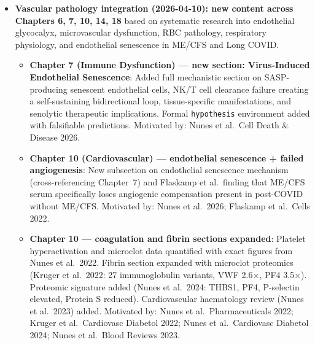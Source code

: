 \begin{itemize}

  \item \textbf{Vascular pathology integration (2026-04-10): new content across Chapters 6, 7, 10, 14, 18}
    based on systematic research into endothelial glycocalyx, microvascular dysfunction, RBC pathology,
    respiratory physiology, and endothelial senescence in ME/CFS and Long COVID.
    \begin{itemize}

      \item \textbf{Chapter 7 (Immune Dysfunction) --- new section: Virus-Induced Endothelial Senescence}:
        Added full mechanistic section on SASP-producing senescent endothelial cells, NK/T cell clearance
        failure creating a self-sustaining bidirectional loop, tissue-specific manifestations, and senolytic
        therapeutic implications. Formal \texttt{hypothesis} environment added with falsifiable predictions.
        Motivated by: Nunes et al.\ Cell Death \& Disease 2026.
        \cite{Nunes2026endothelialSenescence}

      \item \textbf{Chapter 10 (Cardiovascular) --- endothelial senescence + failed angiogenesis}:
        New subsection on endothelial senescence mechanism (cross-referencing Chapter~7) and Flaskamp et al.\
        finding that ME/CFS serum specifically loses angiogenic compensation present in post-COVID without ME/CFS.
        Motivated by: Nunes et al.\ 2026; Flaskamp et al.\ Cells 2022.
        \cite{Nunes2026endothelialSenescence, Flaskamp2022endothelial}

      \item \textbf{Chapter 10 --- coagulation and fibrin sections expanded}:
        Platelet hyperactivation and microclot data quantified with exact figures from Nunes et al.\ 2022.
        Fibrin section expanded with microclot proteomics (Kruger et al.\ 2022: 27 immunoglobulin variants,
        VWF 2.6$\times$, PF4 3.5$\times$). Proteomic signature added (Nunes et al.\ 2024: THBS1, PF4, P-selectin elevated,
        Protein S reduced). Cardiovascular haematology review (Nunes et al.\ 2023) added.
        Motivated by: Nunes et al.\ Pharmaceuticals 2022; Kruger et al.\ Cardiovasc Diabetol 2022;
        Nunes et al.\ Cardiovasc Diabetol 2024; Nunes et al.\ Blood Reviews 2023.
        \cite{NunesPlatelets2022mecfs, KrugerMicroclot2022longcovid, NunesProteomics2024mecfs, NunesBloodReviews2023mecfs}


\end{itemize}
\end{itemize}
